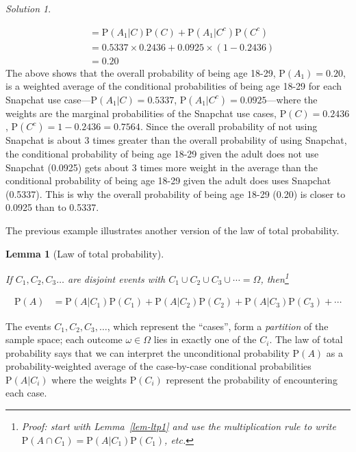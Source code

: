 \documentclass[
  letterpaper,
  DIV=11,
  numbers=noendperiod]{scrreprt}
\theoremstyle{plain}
\newtheorem{lemma}{Lemma}[chapter]
\theoremstyle{definition}
\theoremstyle{definition}
\theoremstyle{definition}
\theoremstyle{remark}
\newtheorem{refsolution}{Solution}[chapter]
\begin{document}
\begin{tcolorbox}
\begin{refsolution}
\begin{enumerate}
\begin{align*}
   & = \textrm{P}(A_1 | C)\textrm{P}(C) + \textrm{P}(A_1 | C^c)\textrm{P}(C^c)\\
   & = 0.5337\times 0.2436 + 0.0925 \times (1 - 0.2436)\\
   & = 0.20
   \end{align*} The above shows that the overall probability of being
  age 18-29, \(\textrm{P}(A_1) = 0.20\), is a weighted average of the
  conditional probabilities of being age 18-29 for each Snapchat use
  case---\(\textrm{P}(A_1|C) = 0.5337\),
  \(\textrm{P}(A_1|C^c) = 0.0925\)---where the weights are the marginal
  probabilities of the Snapchat use cases, \(\textrm{P}(C) = 0.2436\),
  \(\textrm{P}(C^c) = 1-0.2436 = 0.7564\). Since the overall probability
  of not using Snapchat is about 3 times greater than the overall
  probability of using Snapchat, the conditional probability of being
  age 18-29 given the adult does not use Snapchat (0.0925) gets about 3
  times more weight in the average than the conditional probability of
  being age 18-29 given the adult does uses Snapchat (0.5337). This is
  why the overall probability of being age 18-29 (0.20) is closer to
  0.0925 than to 0.5337.
\end{enumerate}

\label{sol-conditional-probability-def-ltp}

\end{refsolution}

\end{tcolorbox}

The previous example illustrates another version of the law of total
probability.

\begin{lemma}[Law of total
probability]\protect\hypertarget{lem-ltp}{}\label{lem-ltp}

If \(C_1, C_2, C_3\ldots\) are disjoint events with
\(C_1\cup C_2 \cup C_3\cup \cdots =\Omega\), then\footnote{Proof: start
  with Lemma~\ref{lem-ltp1} and use the multiplication rule to write
  \(\textrm{P}(A \cap C_1)=\textrm{P}(A|C_1)\textrm{P}(C_1)\), etc.}

\end{lemma}

\begin{align*}
    \textrm{P}(A) & = \textrm{P}(A |C_1)\textrm{P}(C_1) + \textrm{P}(A | C_2)\textrm{P}(C_2) + \textrm{P}(A | C_3)\textrm{P}(C_3) + \cdots
\end{align*}

The events \(C_1, C_2, C_3, \ldots\), which represent the ``cases'',
form a \emph{partition} of the sample space; each outcome
\(\omega\in\Omega\) lies in exactly one of the \(C_i\). The law of total
probability says that we can interpret the unconditional probability
\(\textrm{P}(A)\) as a probability-weighted average of the case-by-case
conditional probabilities \(\textrm{P}(A|C_i)\) where the weights
\(\textrm{P}(C_i)\) represent the probability of encountering each case.
\end{document}
